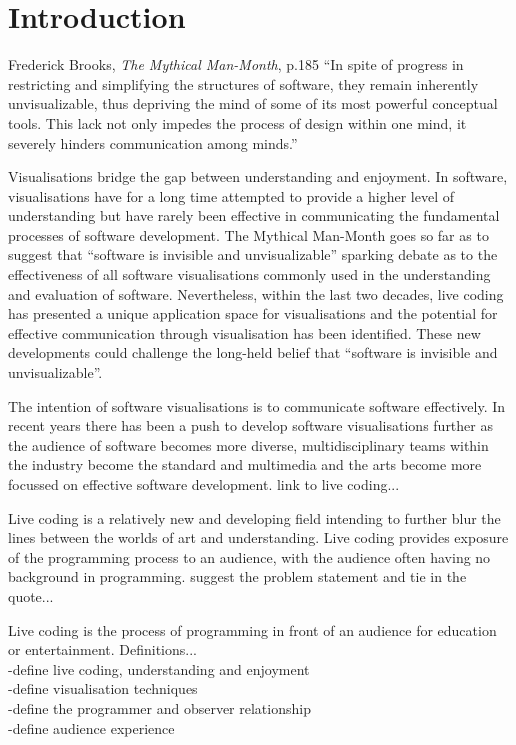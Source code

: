 
\chapter{Introduction}
\label{chap:introduction}

\begin{chapquote}{Frederick Brooks, \textit{The Mythical Man-Month}, p.185}
``In spite of progress in restricting and simplifying the structures of software, they remain inherently unvisualizable, thus depriving the mind of some of its most powerful conceptual tools. This lack not only impedes the process of design within one mind, it severely hinders communication among minds.''
\end{chapquote}

Visualisations bridge the gap between understanding and enjoyment. In software, visualisations have for a long time attempted to provide a higher level of understanding but have rarely been effective in communicating the fundamental processes of software development. The Mythical Man-Month goes so far as to suggest that ``software is invisible and unvisualizable''\cite{Brooks1995} sparking debate as to the effectiveness of all software visualisations commonly used in the understanding and evaluation of software. Nevertheless, within the last two decades, live coding has presented a unique application space for visualisations and the potential for effective communication through visualisation has been identified. These new developments could challenge the long-held belief that ``software is invisible and unvisualizable''.

The intention of software visualisations is to communicate software effectively. In recent years there has been a push to develop software visualisations further as the audience of software becomes more diverse, multidisciplinary teams within the industry become the standard and multimedia and the arts become more focussed on effective software development. {\color{red} link to live coding...}

Live coding is a relatively new and developing field intending to further blur the lines between the worlds of art and understanding. Live coding provides exposure of the programming process to an audience, with the audience often having no background in programming. {\color{red} suggest the problem statement and tie in the quote...}

Live coding is the process of programming in front of an audience for education or entertainment. 
Definitions...\\
-define live coding, understanding and enjoyment\\
-define visualisation techniques\\
-define the programmer and observer relationship\\
-define audience experience\\

